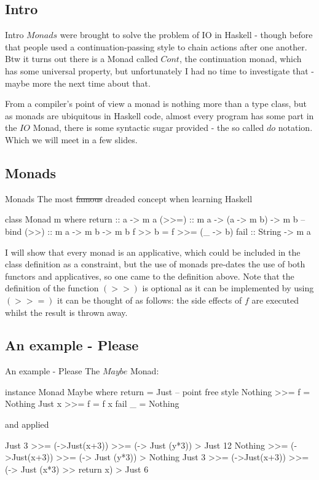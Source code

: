 \documentclass{beamer}
\begin{document}
\subsection{Intro}
\begin{frame}[fragile]{Intro}
$Monads$ were brought to solve the problem of IO in Haskell - though before that
people used a continuation-passing style to chain actions after one another. Btw
it turns out there is a Monad called $Cont$, the continuation monad, which has
some universal property, but unfortunately I had no time to investigate that -
maybe more the next time about that.

From a compiler's point of view a monad is nothing more than a type class, but
as monads are ubiquitous in Haskell code, almost every program has some part in
the $IO$ Monad, there is some syntactic sugar provided - the so called $do$
notation. Which we will meet in a few slides.
\end{frame}
\subsection{Monads}
\begin{frame}[fragile]{Monads}
The most \sout{famous} dreaded concept when learning Haskell
\begin{code}
    class Monad m where
        return :: a -> m a
        (>>=)  :: m a -> (a -> m b) -> m b -- bind
        (>>)   :: m a -> m b -> m b
        f >> b = f >>= (\_ -> b)
        fail :: String -> m a
\end{code}
I will show that every monad is an applicative, which could be included
in the class definition as a constraint, but the use of monads pre-dates the use
of both functors and applicatives, so one came to the definition above.
Note that the definition of the function $(>>)$ is optional as it can be
implemented by using $(>>=)$ it can be thought of as follows:
the side effects of $f$ are executed whilst the result is thrown away.
\end{frame}

\subsection{An example - Please}
\begin{frame}[fragile]{An example - Please}
The $Maybe$ Monad:
\begin{code}
    instance Monad Maybe where
        return = Just -- point free style
        Nothing >>= f = Nothing
        Just x >>= f = f x
        fail _ = Nothing
\end{code}
and applied
\begin{code}%
    Just 3 >>= (\x->Just(x+3)) >>= (\x -> Just (y*3))
    > Just 12
    Nothing >>= (\x->Just(x+3)) >>= (\x -> Just (y*3))
    > Nothing
    Just 3 >>= (\x->Just(x+3)) >>= (\x-> Just (x*3) >> return x)
    >  Just 6
\end{code}
\end{frame}
\end{document}
